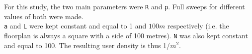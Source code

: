 \hfill \break
For this study, the two main parameters were \colorbox{gray!30}{\large \texttt{R}} and \colorbox{gray!30}{\large \texttt{p}}. Full sweeps for different values of both were made. \\
\colorbox{gray!30}{\large \texttt{a}} and \colorbox{gray!30}{\large \texttt{L}} were kept constant and equal to 1 and $100 m$ respectively (i.e. the floorplan is always a square with a side of 100 metres). \colorbox{gray!30}{\large \texttt{N}} was also kept constant and equal to 100. The resulting user density is thus 1/$m^{2}$.
